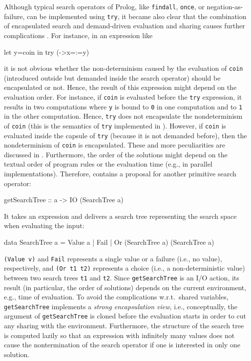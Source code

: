 \documentclass[english]{lni}
\newcommand{\code}[1]{\texttt{\small{}#1}}
\begin{document}
Although typical search operators of Prolog,
like \code{findall}, \code{once}, or negation-as-failure,
can be implemented using \code{try},
it became also clear that the combination of
encapsulated search and demand-driven evaluation
and sharing causes further complications \cite{BrasselHanusHuch04JFLP}.
For instance, in an expression like
\begin{curry}
let y=coin in try (\x->x=:=y)
\end{curry}
it is not obvious whether the non-determinism caused by the evaluation
of \code{coin} (introduced outside
but demanded inside the search operator) should be encapsulated or not.
Hence, the result of this expression might depend on the evaluation order.
For instance,
if \code{coin} is evaluated before the \code{try} expression,
it results in two computations where \code{y} is bound to \code{0}
in one computation and to \code{1} in the other computation.
Hence, \code{try} does not encapsulate the nondeterminism of \code{coin}
(this is the semantics of \code{try} implemented in \cite{Lux99FLOPS}).
However, if \code{coin} is evaluated inside the capsule of \code{try}
(because it is not demanded before), then the nondeterminism of
\code{coin} is encapsulated.
These and more peculiarities are discussed in \cite{BrasselHanusHuch04JFLP}.
Furthermore, the order of the solutions might depend on the
textual order of program rules or the evaluation time
(e.g., in parallel implementations).
Therefore, \cite{BrasselHanusHuch04JFLP} contains a proposal
for another primitive search operator:
\begin{curry}
getSearchTree :: a -> IO (SearchTree a)
\end{curry}
It takes an expression and delivers a search tree representing
the search space when evaluating the input:
\begin{curry}
data SearchTree a = Value a
                  | Fail
                  | Or (SearchTree a) (SearchTree a)
\end{curry}
\code{(Value v)} and \code{Fail} represents a single value
or a failure (i.e., no value), respectively,
and \code{(Or t1 t2)} represents a choice (i.e., a non-deterministic value)
between two search trees \code{t1} and \code{t2}.
Since \code{getSearchTree} is an I/O action, its result (in particular,
the order of solutions) depends on the current environment, e.g.,
time of evaluation.
To avoid the complications w.r.t.\ shared variables,
\code{getSearchTree} implements a \emph{strong encapsulation view},
i.e., conceptually, the argument of \code{getSearchTree}
is cloned before the evaluation starts in order to cut any sharing
with the environment.
Furthermore, the structure of the search tree is computed lazily
so that an expression with infinitely many values does not cause
the nontermination of the search operator if one is interested in only
one solution.
\end{document}
